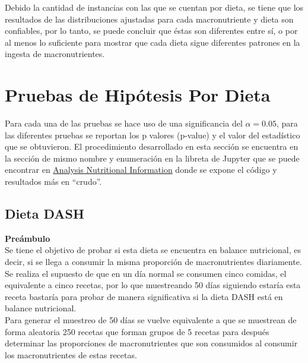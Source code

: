 \documentclass[12pt,a4paper]{article}
\begin{document}
        Debido la cantidad de instancias con las que se cuentan por dieta, se tiene que 
        los resultados de las distribuciones ajustadas para cada macronutriente y dieta 
        son confiables, por lo tanto, se puede concluir que éstas son diferentes entre sí, 
        o por al menos lo suficiente para mostrar que cada dieta sigue diferentes patrones 
        en la ingesta de macronutrientes.

\newpage

\section{Pruebas de Hipótesis Por Dieta}

    Para cada una de las pruebas se hace uso de una significancia del $\alpha = 0.05$, 
    para las diferentes pruebas se reportan los p valores (p-value) y el valor del 
    estadístico que se obtuvieron. El procedimiento desarrollado en esta sección se 
    encuentra en la sección de mismo nombre y enumeración en la libreta de Jupyter 
    que se puede encontrar en \href{https://github.com/alexisuaguilaru/Analysis_Nutritional_Information/blob/main/Documentation/AlexisAguilar_Reporte.ipynb}{Analysis Nutritional Information} 
    donde se expone el código y resultados más en ``crudo''.

    \subsection{Dieta DASH}
        \textbf{Preámbulo}\\
        { 
            Se tiene el objetivo de probar si esta dieta se encuentra 
            en balance nutricional, es decir, si se llega a consumir la 
            misma proporción de macronutrientes diariamente.\\

            Se realiza el supuesto de que en un día normal se consumen 
            cinco comidas, el equivalente a cinco recetas, por lo que 
            muestreando 50 días siguiendo estaría esta receta bastaría 
            para probar de manera significativa si la dieta DASH está en 
            balance nutricional.\\

            Para generar el muestreo de 50 días se vuelve equivalente a 
            que se muestrean de forma aleatoria 250 recetas que forman 
            grupos de 5 recetas para después determinar las proporciones 
            de macronutrientes que son consumidos al consumir los macronutrientes 
            de estas recetas.\\
        }
\end{document}
